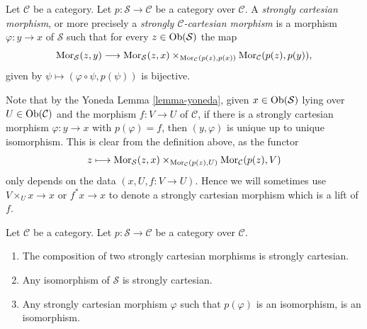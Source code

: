 \begin{definition}
\label{definition-cartesian-over-C}
Let $\mathcal{C}$ be a category.
Let $p : \mathcal{S} \to \mathcal{C}$ be a category over $\mathcal{C}$.
A {\it strongly cartesian morphism}, or more precisely a
{\it strongly $\mathcal{C}$-cartesian morphism} is a
morphism $\varphi : y \to x$ of $\mathcal{S}$ such that
for every $z \in \mathop{\mathrm{Ob}}\nolimits(\mathcal{S})$ the map
$$
\mathop{\mathrm{Mor}}\nolimits_\mathcal{S}(z, y)
\longrightarrow
\mathop{\mathrm{Mor}}\nolimits_\mathcal{S}(z, x)
\times_{\mathop{\mathrm{Mor}}\nolimits_\mathcal{C}(p(z), p(x))}
\mathop{\mathrm{Mor}}\nolimits_\mathcal{C}(p(z), p(y)),
$$
given by $\psi \longmapsto (\varphi \circ \psi, p(\psi))$
is bijective.
\end{definition}

\noindent
Note that by the Yoneda Lemma \ref{lemma-yoneda}, given
$x \in \mathop{\mathrm{Ob}}\nolimits(\mathcal{S})$ lying over $U \in \mathop{\mathrm{Ob}}\nolimits(\mathcal{C})$
and the morphism $f : V \to U$ of $\mathcal{C}$, if there is a
strongly cartesian morphism $\varphi : y \to x$ with $p(\varphi) = f$,
then $(y, \varphi)$ is unique up to unique isomorphism. This is
clear from the definition above, as the functor
$$
z
\longmapsto
\mathop{\mathrm{Mor}}\nolimits_\mathcal{S}(z, x)
\times_{\mathop{\mathrm{Mor}}\nolimits_\mathcal{C}(p(z), U)}
\mathop{\mathrm{Mor}}\nolimits_\mathcal{C}(p(z), V)
$$
only depends on the data $(x, U, f : V \to U)$. Hence we
will sometimes use $V \times_U x \to x$ or $f^*x \to x$
to denote a strongly cartesian morphism which is a lift of $f$.

\begin{lemma}
\label{lemma-composition-cartesian}
Let $\mathcal{C}$ be a category.
Let $p : \mathcal{S} \to \mathcal{C}$ be a category over $\mathcal{C}$.
\begin{enumerate}
\item The composition of two strongly cartesian morphisms
is strongly cartesian.
\item Any isomorphism of $\mathcal{S}$ is strongly cartesian.
\item Any strongly cartesian morphism $\varphi$ such that $p(\varphi)$
is an isomorphism, is an isomorphism.
\end{enumerate}
\end{lemma}

